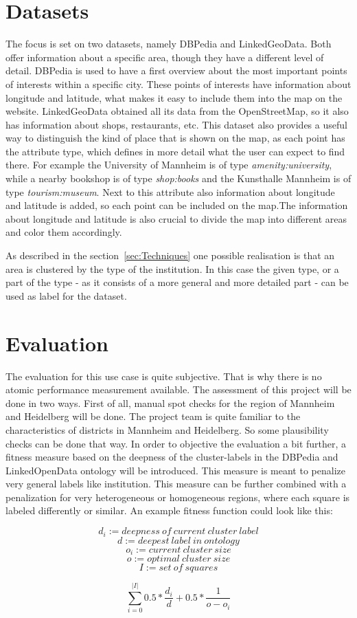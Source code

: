 \section{Datasets}
The focus is set on two datasets, namely DBPedia and LinkedGeoData. Both offer information about a specific area, though they have a different level of detail. DBPedia is used to have a first overview about the most important points of interests within a specific city. These points of interests have information about longitude and latitude, what makes it easy to include them into the map on the website. LinkedGeoData obtained all its data from the OpenStreetMap, so it also has information about shops, restaurants, etc. This dataset also provides a useful way to distinguish the kind of place that is shown on the map, as each point has the attribute type, which defines in more detail what the user can expect to find there. For example the University of Mannheim is of type \textit{amenity:university}, while a nearby bookshop is of type \textit{shop:books} and the Kunsthalle Mannheim is of type \textit{tourism:museum}. Next to this attribute also information about longitude and latitude is added, so each point can be included on the map.The information about longitude and latitude is also crucial to divide the map into different areas and color them accordingly.

As described in the section~\ref{sec:Techniques} one possible realisation is that an area is clustered by the type of the institution. In this case the given type, or a part of the type - as it consists of a more general and more detailed part - can be used as label for the dataset.

\section{Evaluation}

The evaluation for this use case is quite subjective. That is why there is no atomic performance measurement available. The assessment of this project will be done in two ways. First of all, manual spot checks for the region of Mannheim and Heidelberg will be done. The project team is quite familiar to the characteristics of districts in Mannheim and Heidelberg. So some plausibility checks can be done that way. In order to objective the evaluation a bit further, a fitness measure based on the deepness of the cluster-labels in the DBPedia and LinkedOpenData ontology will be introduced. This measure is meant to penalize very general labels like institution. This measure can be further combined with a penalization for very heterogeneous or homogeneous regions, where each square is labeled differently or similar. An example fitness function could look like this:

\[d_i := deepness~of~current~cluster~label \]
\[d := deepest~label~in~ontology \]
\[o_i := current~cluster~size \]
\[o := optimal~cluster~size \]
\[I := set~of~squares \]

\[\sum_{i=0}^{|I|} 0.5 * \frac{d_i}{d} + 0.5 * \frac{1}{ o - o_i }\]


